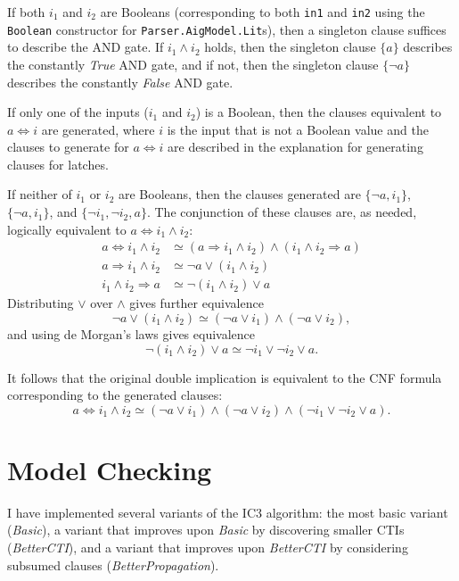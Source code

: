 \documentclass[12pt,a4paper,twoside,openright]{report}
\begin{document}
{If both $i_1$ and $i_2$ are Booleans (corresponding to both \verb,in1, and \verb,in2, using the \verb,Boolean,
constructor for \verb,Parser.AigModel.Lit,s), then a singleton clause suffices to describe the AND gate.
If $i_1 \wedge i_2$ holds, then the singleton clause $\{a\}$ describes the constantly {\it True} AND gate,
and if not, then the singleton clause $\{\neg a\}$ describes the constantly {\it False} AND gate.

If only one of the inputs ($i_1$ and $i_2$) is a Boolean, then the clauses equivalent to $a \Leftrightarrow i$
are generated, where $i$ is the input that is not a Boolean value and the clauses to generate for $a \Leftrightarrow i$ 
are described in the explanation for generating clauses for latches.

If neither of $i_1$ or $i_2$ are Booleans, then the clauses generated are
$\{\neg a, i_1\}$, $\{\neg a, i_1\}$, and
$\{\neg i_1,\neg i_2, a\}$. The conjunction of these clauses are, as needed,
logically equivalent to $a \Leftrightarrow i_1 \wedge i_2$:
\begin{align*}
a \Leftrightarrow i_1 \wedge i_2 &\simeq (a \Rightarrow i_1 \wedge i_2) \wedge (i_1 \wedge i_2 \Rightarrow a)\\
a \Rightarrow i_1 \wedge i_2 &\simeq \neg a \vee (i_1 \wedge i_2)\\
i_1 \wedge i_2 \Rightarrow a &\simeq \neg (i_1 \wedge i_2) \vee a
\end{align*}
Distributing $\vee$ over $\wedge$ gives further equivalence
$$\neg a \vee (i_1 \wedge i_2) \simeq
(\neg a \vee i_1) \wedge (\neg a \vee i_2),$$
and using de Morgan's laws gives equivalence
$$\neg (i_1 \wedge i_2) \vee a \simeq
\neg i_1 \vee \neg i_2 \vee a.$$

It follows that the original double implication is equivalent to the CNF
formula corresponding to the generated clauses:
$$a \Leftrightarrow i_1 \wedge i_2 \simeq
(\neg a \vee i_1) \wedge (\neg a \vee i_2) \wedge (\neg i_1 \vee \neg i_2 \vee a).$$


\section{Model Checking}
\label{impl:modelchecker}

I have implemented several variants of the IC3 algorithm:
the most basic variant (\emph{Basic}), a variant that
improves upon \emph{Basic} by discovering smaller CTIs (\emph{BetterCTI}),
and a variant that improves upon \emph{BetterCTI} by considering subsumed clauses
(\emph{BetterPropagation}).

}
\end{document}
